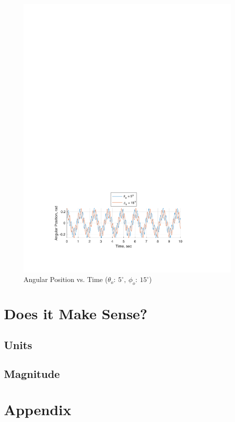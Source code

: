 \documentclass[12pt]{report}
\begin{document}
\begin{flushleft}
\begin{figure}[ht]
  \includegraphics[center]{3}
  \caption{Angular Position vs. Time ($\theta_o:~5^\circ,~\phi_o:~15^\circ$)}
\end{figure}
\section{Does it Make Sense?}
\subsection{Units}

\subsection{Magnitude}

\section{Appendix} \label{appendix}


\end{flushleft}
\end{document}
